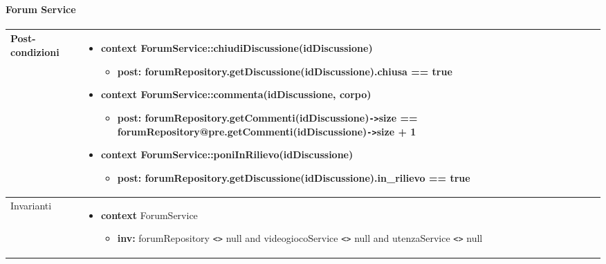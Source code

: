 \paragraph{Forum Service}
\small\begin{tabular}{|| l | p{28em} ||} 
	\hline
	Post-condizioni & \begin{itemize}[leftmargin=*]
		\item \textbf{context} ForumService::chiudiDiscussione(idDiscussione)
		\begin{itemize}
			\item[ ] \textbf{post:} forumRepository.\newline getDiscussione(idDiscussione).chiusa == true
		\end{itemize}

		\item \textbf{context} ForumService::commenta(idDiscussione, corpo)
		\begin{itemize}
			\item[ ] \textbf{post:} forumRepository.getCommenti(idDiscussione)\verb|->|size == forumRepository\newline @pre.getCommenti(idDiscussione)\verb|->|size + 1
		\end{itemize}

		\item \textbf{context} ForumService::poniInRilievo(idDiscussione)
		\begin{itemize}
			\item[ ] \textbf{post:} forumRepository\newline .getDiscussione(idDiscussione).in\_rilievo == true
		\end{itemize}
	\end{itemize}\\
	\hline
	Invarianti & \begin{itemize}
		\item \textbf{context} ForumService
		\begin{itemize}
			\item[ ] \textbf{inv:} forumRepository \verb|<>| null and  videogiocoService \verb|<>| null and utenzaService \verb|<>| null
		\end{itemize}
	\end{itemize}\\
	\hline
\end{tabular}

\newpage
